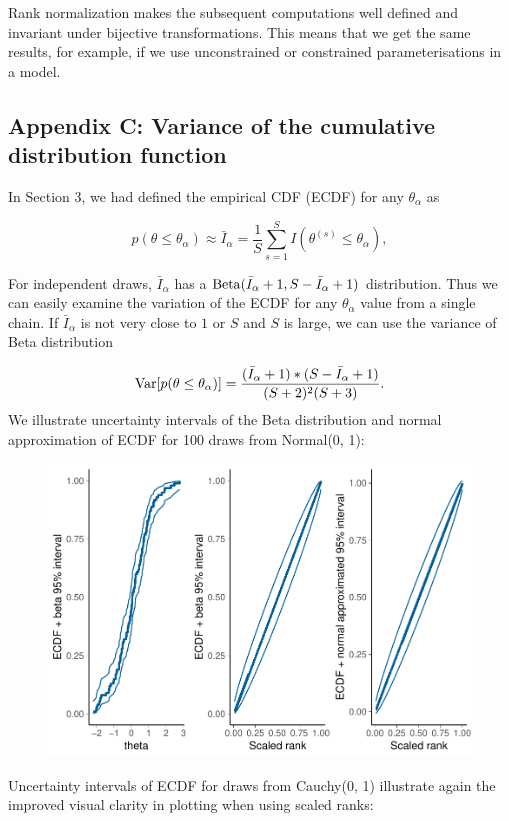 \documentclass[american,]{article}
\begin{document}
Rank normalization makes the subsequent computations well defined and
invariant under bijective transformations. This means that we get the
same results, for example, if we use unconstrained or constrained
parameterisations in a model.

\hypertarget{AppendixC}{%
\subsection*{Appendix C: Variance of the cumulative distribution
function}\label{AppendixC}}

In Section 3, we had defined the empirical CDF (ECDF) for any
\(\theta_\alpha\) as

\[
p(\theta \leq \theta_\alpha) \approx \bar{I}_\alpha = \frac{1}{S}\sum_{s=1}^S
I(\theta^{(s)} \leq\theta_\alpha),
\]

For independent draws, \(\bar{I}_\alpha\) has a
\({\rm Beta}(\bar{I}_\alpha+1, S - \bar{I}_\alpha + 1)\) distribution.
Thus we can easily examine the variation of the ECDF for any
\(\theta_\alpha\) value from a single chain. If \(\bar{I}_\alpha\) is
not very close to \(1\) or \(S\) and \(S\) is large, we can use the
variance of Beta distribution

\[
{\rm Var}[p(\theta \leq \theta_\alpha)] =
\frac{(\bar{I}_\alpha+1)*(S-\bar{I}_\alpha+1)}{(S+2)^2(S+3)}.
\] We illustrate uncertainty intervals of the Beta distribution and
normal approximation of ECDF for 100 draws from Normal(0, 1):

\begin{figure}[t]
  \centering
  \includegraphics[width=0.6\linewidth]{graphics/ranknorm-beta-1.pdf}
\end{figure}

Uncertainty intervals of ECDF for draws from Cauchy(0, 1) illustrate
again the improved visual clarity in plotting when using scaled ranks:
\end{document}
